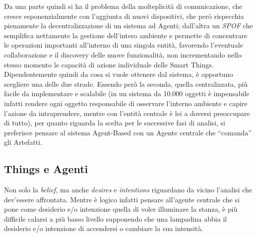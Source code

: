 \documentclass[12pt,a4paper,openright,oneside]{report}
\newcommand{\quotes}[1]{``#1''}
\begin{document}
Da una parte quindi si ha il problema della molteplicità di comunicazione, che cresce esponenzialmente con l'aggiunta di nuovi dispositivi, che però rispecchia pienamente la decentralizzazione di un sistema ad Agenti; dall'altra un \textit{SPOF} che semplifica nettamente la gestione dell'intero ambiente e permette di concentrare le operazioni importanti all'interno di una singola entità, favorendo l'eventuale collaborazione e il discovery delle nuove funzionalità, non incrementando nello stesso momento le capacità di azione individuale delle Smart Things.
Dipendentemente quindi da cosa si vuole ottenere dal sistema, è opportuno scegliere una delle due strade. Essendo però la seconda, quella centralizzata, più facile da implementare e scalabile (in un sistema da 10.000 oggetti è impensabile infatti rendere ogni oggetto responsabile di osservare l'interno ambiente e capire l'azione da intraprendere, mentre con l'entità centrale è lei a doversi preoccupare di tutto), per quanto riguarda la scelta per le successive fasi di analisi, si preferisce pensare al sistema Agent-Based con un Agente centrale che \quotes{comanda} gli Artefatti.

\subsection{Things e Agenti}
\label{sec:agentthings}
Non solo la \textit{belief}, ma anche \textit{desires} e \textit{intentions} riguardano da vicino l'analisi che dev'essere affrontata. Mentre è logico infatti pensare all'agente centrale che si pone come desiderio e/o intenzione quella di voler illuminare la stanza, è più difficile calarsi a più basso livello supponendo che una lampadina abbia il desiderio e/o intenzione di accendersi o cambiare la sua intensità.\\
\end{document}
